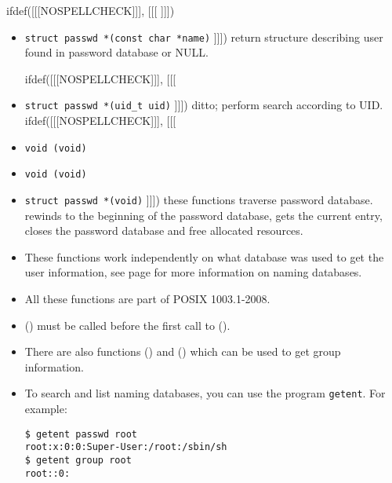 ifdef([[[NOSPELLCHECK]]], [[[
]]])

\begin{slide}
\begin{itemize}
ifdef([[[NOSPELLCHECK]]], [[[
\item \texttt{struct passwd *(const char *name)}
]]])
return structure describing user found in password database or NULL.

ifdef([[[NOSPELLCHECK]]], [[[
\item \texttt{struct passwd *(uid\_t uid)}
]]])
ditto; perform search according to UID.
ifdef([[[NOSPELLCHECK]]], [[[
\item \texttt{void (void)}
\item \texttt{void (void)}
\item \texttt{struct passwd *(void)}
]]])
these functions traverse password database.  rewinds to the
beginning of the password database,  gets the current entry,
 closes the password database and free allocated resources.
\end{itemize}
\end{slide}

\begin{itemize}
\item These functions work independently on what database was used to get the
user information, see page \pageref{name_service_switch} for more information on
naming databases.
\item All these functions are part of POSIX 1003.1-2008.
\item {}() must be called before the first call to
().
\item There are also functions () and () which
can be used to get group information.
\item To search and list naming databases, you can use the program \texttt{getent}.
For example:

\begin{verbatim}
$ getent passwd root
root:x:0:0:Super-User:/root:/sbin/sh
$ getent group root
root::0:
\end{verbatim}
\end{itemize}



